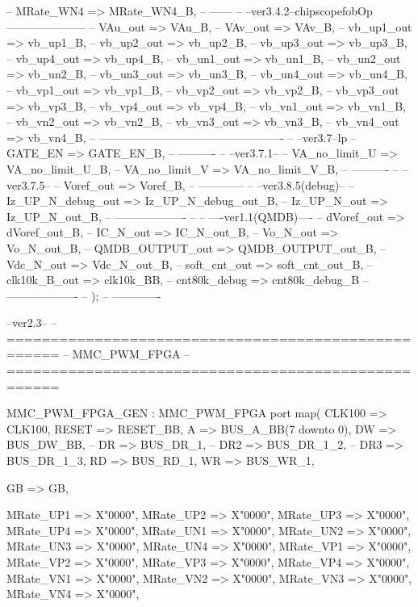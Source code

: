 \begin{mylisting}[language=VHDL,caption=トップモジュール,label=appF_Top_module_VHDL]
{{{--			MRate_WN4	=>	MRate_WN4_B,
--			------
--			--ver3.4.2--chipscopefobOp---------------------
--			VAu_out 		=>	VAu_B,
--			VAv_out 		=>	VAv_B,
--			vb_up1_out  =>	vb_up1_B,
--			vb_up2_out  =>	vb_up2_B,
--			vb_up3_out  =>	vb_up3_B,
--			vb_up4_out  =>	vb_up4_B,
--			vb_un1_out  =>	vb_un1_B,
--			vb_un2_out  =>	vb_un2_B,
--			vb_un3_out  =>	vb_un3_B,
--			vb_un4_out  =>	vb_un4_B,
--			vb_vp1_out  =>	vb_vp1_B,
--			vb_vp2_out  =>	vb_vp2_B,
--			vb_vp3_out  =>	vb_vp3_B,
--			vb_vp4_out  =>	vb_vp4_B,
--			vb_vn1_out  =>	vb_vn1_B,
--			vb_vn2_out  =>	vb_vn2_B,
--			vb_vn3_out  =>	vb_vn3_B,
--			vb_vn4_out  =>	vb_vn4_B,
--			-------------------------------------------------
--			--ver3.7--lp
--			GATE_EN => GATE_EN_B,
--			----------
--			--ver3.7.1--
--			VA_no_limit_U  =>	VA_no_limit_U_B,
--			VA_no_limit_V  =>	VA_no_limit_V_B,
--			----------
--			--ver3.7.5--
--			Voref_out  =>	Voref_B,
--			------------
--			--ver3.8.5(debug)--
--			Iz_UP_N_debug_out => Iz_UP_N_debug_out_B,
--			Iz_UP_N_out => Iz_UP_N_out_B,
--			-------------------
--			
--			----ver1.1(QMDB)----			
--			dVoref_out => dVoref_out_B,
--			IC_N_out   => IC_N_out_B,
--			Vo_N_out   => Vo_N_out_B,
--			QMDB_OUTPUT_out => QMDB_OUTPUT_out_B,
--			Vdc_N_out  => Vdc_N_out_B,
--			soft_cnt_out	 => soft_cnt_out_B,
--			clk10k_B_out => clk10k_BB,
--			cnt80k_debug => cnt80k_debug_B
--			-------------------
--			);
--
-------------


--ver2.3--
-- ====================================================
-- MMC_PWM_FPGA
-- ====================================================

	MMC_PWM_FPGA_GEN : MMC_PWM_FPGA
		port map(
			CLK100		=> CLK100,
			RESET		=> RESET_BB,
			A			=> BUS_A_BB(7 downto 0),
			DW			=> BUS_DW_BB,
--			DR			=> BUS_DR_1,
--			DR2			=> BUS_DR_1_2,
--			DR3			=> BUS_DR_1_3,
			RD			=> BUS_RD_1,
			WR			=> BUS_WR_1,
			
			GB       => GB,
			
			MRate_UP1 => X"0000",
			MRate_UP2 => X"0000",
			MRate_UP3 => X"0000",
			MRate_UP4 => X"0000",
			MRate_UN1 => X"0000",
			MRate_UN2 => X"0000",
			MRate_UN3 => X"0000",
			MRate_UN4 => X"0000",
			MRate_VP1 => X"0000",
			MRate_VP2 => X"0000",
			MRate_VP3 => X"0000",
			MRate_VP4 => X"0000",
			MRate_VN1 => X"0000",
			MRate_VN2 => X"0000",
			MRate_VN3 => X"0000",
			MRate_VN4 => X"0000",
		
}}}
\end{mylisting}
